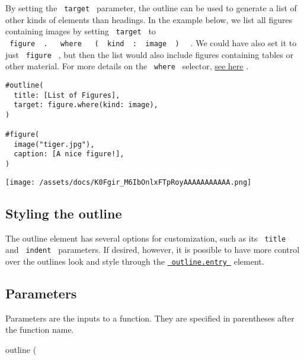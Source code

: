 By setting the \texttt{\ target\ } parameter, the outline can be used to
generate a list of other kinds of elements than headings. In the example
below, we list all figures containing images by setting
\texttt{\ target\ } to
\texttt{\ figure\ }{\texttt{\ .\ }}\texttt{\ }{\texttt{\ where\ }}\texttt{\ }{\texttt{\ (\ }}\texttt{\ kind\ }{\texttt{\ :\ }}\texttt{\ image\ }{\texttt{\ )\ }}\texttt{\ }
. We could have also set it to just \texttt{\ figure\ } , but then the
list would also include figures containing tables or other material. For
more details on the \texttt{\ where\ } selector,
\href{/docs/reference/foundations/function/\#definitions-where}{see
here} .

\begin{verbatim}
#outline(
  title: [List of Figures],
  target: figure.where(kind: image),
)

#figure(
  image("tiger.jpg"),
  caption: [A nice figure!],
)
\end{verbatim}

\texttt{[image: /assets/docs/K0Fgir\_M6IbOnlxFTpRoyAAAAAAAAAAA.png]}

\subsection{Styling the outline}\label{styling-the-outline}

The outline element has several options for customization, such as its
\texttt{\ title\ } and \texttt{\ indent\ } parameters. If desired,
however, it is possible to have more control over the
outline\textquotesingle s look and style through the
\href{/docs/reference/model/outline/\#definitions-entry}{\texttt{\ outline.entry\ }}
element.

\subsection{\texorpdfstring{{ Parameters
}}{ Parameters }}\label{parameters}

\label{parameters-tooltip}
Parameters are the inputs to a function. They are specified in
parentheses after the function name.

{ outline } (

